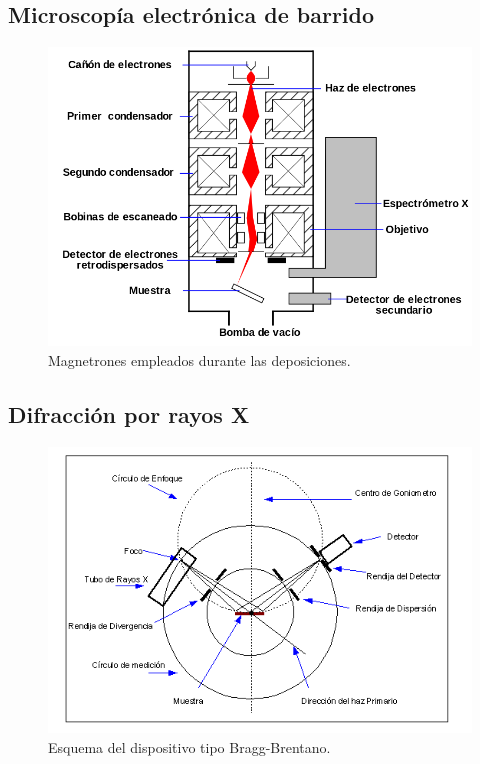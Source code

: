 \documentclass[11pt]{beamer}
\begin{document}
	\subsection{Microscopía electrónica de barrido}
		\begin{frame}{}
			\begin{figure}[H]
				\centering
				\includegraphics[scale=0.1]{img/SEM.png}
				\caption{Magnetrones empleados durante las deposiciones.}
				\label{magnetrones}
			\end{figure}
		\end{frame}
	
	\subsection{Difracción por rayos X}
		\begin{frame}{}
			\begin{figure}[H]
				\centering
				\includegraphics[scale=1]{img/gonio.png}
				\caption{Esquema del dispositivo tipo Bragg-Brentano.}
				\label{magnetrones}
			\end{figure}
		\end{frame}
	
\end{document}
